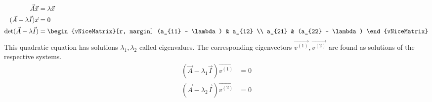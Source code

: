 \begin{description}
        \begin{align}
            \vec{A}\vec{x}                     & = \lambda \vec{x}                         \\
            (\vec{A} - \lambda\vec{I}) \vec{x} & = 0                                       \\
            \det(\vec{A} - \lambda\vec{I})     & = \begin{vNiceMatrix}[r, margin]
                                                       (a_{11} - \lambda) & a_{12}             \\
                                                       a_{21}             & (a_{22} - \lambda)
                                                   \end{vNiceMatrix}
        \end{align}
        This quadratic equation has solutions $ \lambda_1, \lambda_2 $ called eigenvalues.
        The corresponding eigenvectors $ \vec{v^{(1)}}, \vec{v^{(2)}} $ are found as
        solutions of the respective systems.
        \begin{align}
            (\vec{A} - \lambda_1\vec{I}) \vec{v^{(1)}} & = 0 \\
            (\vec{A} - \lambda_2\vec{I}) \vec{v^{(2)}} & = 0
        \end{align}
\end{description}

